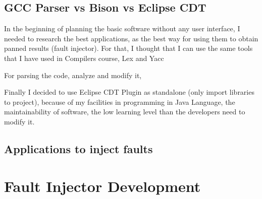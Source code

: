 \subsection{GCC Parser vs Bison vs Eclipse CDT}

In the beginning of planning the basic software without any user interface, I needed to research the best applications, as the best way for using them to obtain panned results (fault injector).
For that, I thought that I can use the same tools that I have used in Compilers course, Lex and Yacc

For parsing the code, analyze and modify it,



Finally I decided to use Eclipse CDT Plugin as standalone (only import libraries to project), because of my facilities in programming in Java Language, the maintainability of software, the low learning level than the developers need to modify it.

\subsection{Applications to inject faults}

\newpage
\section{Fault Injector Development}

